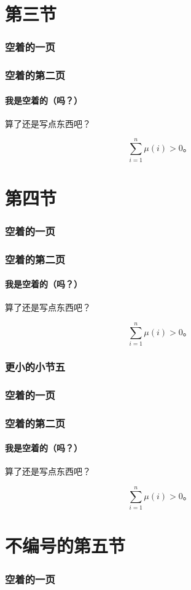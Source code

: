 \documentclass{../pkslide}
\begin{document}
\section{第三节}

\begin{frame}
  \frametitle{空着的一页}
\end{frame}

\begin{frame}
  \frametitle{空着的第二页}
  \framesubtitle{我是空着的（吗？）}
  
  算了还是写点东西吧？
  
  \[ \sum_{i = 1}^{n} \mu(i) > 0 \text{。} \]
\end{frame}

\section{第四节}

\begin{frame}
  \frametitle{空着的一页}
\end{frame}

\begin{frame}
  \frametitle{空着的第二页}
  \framesubtitle{我是空着的（吗？）}
  
  算了还是写点东西吧？
  
  \[ \sum_{i = 1}^{n} \mu(i) > 0 \text{。} \]
\end{frame}

\subsubsection{更小的小节五}

\begin{frame}
  \frametitle{空着的一页}
\end{frame}

\begin{frame}
  \frametitle{空着的第二页}
  \framesubtitle{我是空着的（吗？）}
  
  算了还是写点东西吧？
  
  \[ \sum_{i = 1}^{n} \mu(i) > 0 \text{。} \]
\end{frame}

\section*{不编号的第五节}

\begin{frame}
  \frametitle{空着的一页}
\end{frame}
\end{document}
